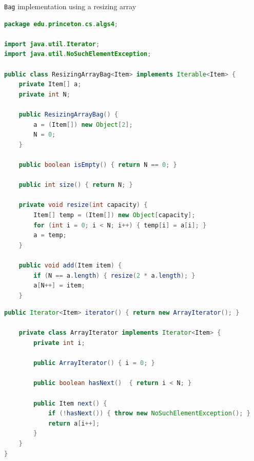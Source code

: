 \documentclass[8pt,a4paper,compress]{beamer}
\begin{document}
\begin{frame}[fragile]
\pause

\lstinline{Bag} implementation using a resizing array
\begin{lstlisting}[language=Java]
package edu.princeton.cs.algs4;

import java.util.Iterator;
import java.util.NoSuchElementException;

public class ResizingArrayBag<Item> implements Iterable<Item> {
    private Item[] a; 
    private int N;  

    public ResizingArrayBag() {
        a = (Item[]) new Object[2];
        N = 0;
    }

    public boolean isEmpty() { return N == 0; }

    public int size() { return N; }

    private void resize(int capacity) {
        Item[] temp = (Item[]) new Object[capacity];
        for (int i = 0; i < N; i++) { temp[i] = a[i]; }
        a = temp;
    }

    public void add(Item item) {
        if (N == a.length) { resize(2 * a.length); }
        a[N++] = item; 
    }
\end{lstlisting}
\end{frame}

\begin{frame}[fragile]
\pause

\begin{lstlisting}[language=Java]
    public Iterator<Item> iterator() { return new ArrayIterator(); }

    private class ArrayIterator implements Iterator<Item> {
        private int i;
        
        public ArrayIterator() { i = 0; } 

        public boolean hasNext()  { return i < N; }
        
        public Item next() {
            if (!hasNext()) { throw new NoSuchElementException(); }
            return a[i++];
        }
    }
}
\end{lstlisting}
\end{frame}
\end{document}
